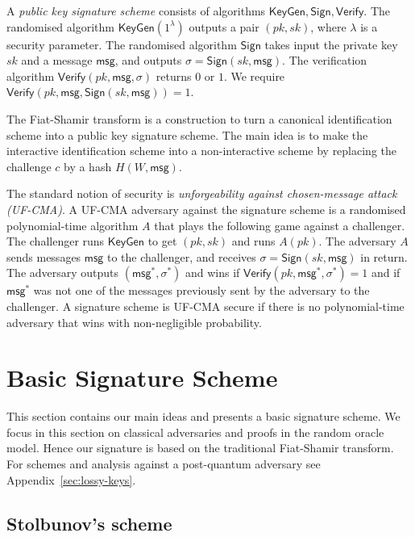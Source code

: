 \documentclass{llncs}
\newcommand{\msg}{\mathsf{msg}}
\newcommand{\KeyGen}{\mathsf{KeyGen}}
\newcommand{\Sign}{\mathsf{Sign}}
\newcommand{\Verify}{\mathsf{Verify}}
\begin{document}
A \emph{public key signature scheme} consists of algorithms $\KeyGen, \Sign, \Verify$.
The randomised algorithm $\KeyGen( 1^\lambda )$ outputs a pair $(pk,sk)$, where $\lambda$ is a security parameter.
The randomised algorithm $\Sign$ takes input the private key $sk$ and a message $\msg$, and  outputs $\sigma = \Sign( sk, \msg )$.
The verification algorithm $\Verify( pk, \msg, \sigma )$ returns $0$ or $1$.
We require $\Verify( pk, \msg, \Sign( sk, \msg )) = 1$.

The Fiat-Shamir transform is a construction to turn a canonical identification scheme into a public key signature scheme. The main idea is to make the interactive identification scheme into a non-interactive scheme by replacing the challenge $c$ by a hash $H( W, \msg )$.

The standard notion of security is \emph{unforgeability against chosen-message attack (UF-CMA)}.
A UF-CMA adversary against the signature scheme is a randomised polynomial-time algorithm $A$ that plays the following game against a challenger.
The challenger runs $\KeyGen$ to get $(pk,sk)$ and runs $A( pk )$.
The adversary $A$ sends messages $\msg$ to the challenger, and receives $\sigma = \Sign(sk, \msg)$ in return.
The adversary outputs $(\msg^*, \sigma^*)$ and wins if $\Verify( pk, \msg^*, \sigma^* ) = 1$ and if $\msg^*$ was not one of the messages previously sent by the adversary to the challenger.
A signature scheme is UF-CMA secure if there is no polynomial-time adversary that wins with non-negligible probability.






\section{Basic Signature Scheme}\label{sec:basic-scheme}

This section contains our main ideas and presents a basic signature scheme.
We focus in this section on classical adversaries and proofs in the random oracle model.
Hence our signature is based on the traditional Fiat-Shamir transform.
For schemes and analysis against a post-quantum adversary see Appendix~\ref{sec:lossy-keys}.

\subsection{Stolbunov's scheme}\label{sec:Stolbunov}
\end{document}
